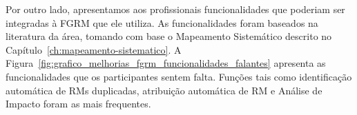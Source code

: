 Por outro lado, apresentamos aos profissionais funcionalidades que poderiam ser
integradas à FGRM que ele utiliza. As funcionalidades foram baseados na
literatura da área, tomando com base o Mapeamento Sistemático descrito no
Capítulo~\ref{ch:mapeamento-sistematico}. A
Figura~\ref{fig:grafico_melhorias_fgrm_funcionalidades_falantes} apresenta as
funcionalidades que os participantes sentem falta. Funções tais como
identificação automática de RMs duplicadas, atribuição automática de RM e
Análise de Impacto foram as mais frequentes.



